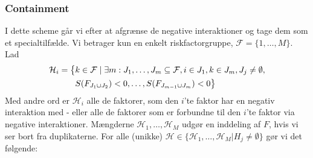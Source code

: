 \documentclass[a4paper, 12pt]{article}
\begin{document}
\subsubsection{Containment}
I dette scheme går vi efter at afgrænse de negative interaktioner og tage dem som et specialtilfælde. Vi betrager kun en enkelt riskfactorgruppe, $\mathcal F=\{1, \dots, M\}$. Lad
\begin{equation}
\mathcal H_i=\bigl\{\begin{lgathered}[t]k\in \mathcal F \mid \exists m: J_1, \dots, J_m\subseteq \mathcal F, i\in J_1, k\in J_m, J_j\neq\emptyset, \\ S(F_{J_1\cup J_2})<0, \dots, S(F_{J_{m-1} \cup J_m})<0\bigr\}\end{lgathered}
\end{equation}
Med andre ord er $\mathcal H_i$ alle de faktorer, som den $i$'te faktor har en negativ interaktion med - eller alle de faktorer som er forbundne til den $i$'te faktor via negative interaktioner. Mængderne $\mathcal H_1, \dots, \mathcal H_M$ udgør en inddeling af $F$, hvis vi ser bort fra duplikaterne. For alle (unikke) $\mathcal H\in \{\mathcal H_1, \dots, \mathcal H_M | H_j\neq \emptyset\}$ gør vi det følgende:
\end{document}
